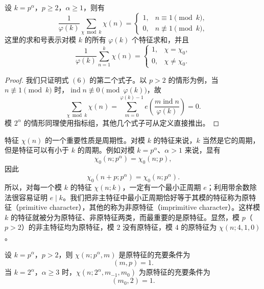 \begin{theorem}[原文 定理 3，正交性]
	设 $k=p^\alpha$，$p\geq 2$，$\alpha\geq 1$，则有
	\begin{equation}
		\frac{1}{\varphi(k)}\sum_{\chi\bmod k}\chi(n)
		=
		\begin{cases}
			1, & n\equiv 1\pmod k,\\
			0, & n\not\equiv 1\pmod k,
		\end{cases}
		\tag{6}
	\end{equation}
	这里的求和号表示对模 $k$ 的所有 $\varphi(k)$ 个特征求和，并且
	\begin{equation}
		\frac{1}{\varphi(k)}\sum_{n=1}^{k}\chi(n)
		=
		\begin{cases}
			1, & \chi=\chi_0,\\
			0, & \chi\neq\chi_0.
		\end{cases}
		\tag{6'}
	\end{equation}
\end{theorem}

\begin{proof}
	我们只证明式 \((6)\) 的第二个式子。以 $p>2$ 的情形为例，当 $n\not\equiv1\pmod k$ 时，$\operatorname{ind}n\not\equiv0\pmod{\varphi(k)}$，故
	\[
		\sum_{\chi\bmod k}\chi(n)
		=
		\sum_{m=0}^{\varphi(k)-1}
		e\left(\frac{m\operatorname{ind}n}{\varphi(k)}\right)
		=0.
	\]
	模 $2^\alpha$ 的情形同理使用指标组，其他几个式子可从定义直接推出。
\end{proof}

特征 $\chi(n)$ 的一个重要性质是周期性。对模 $k$ 的特征来说，$k$ 当然是它的周期，但是特征可以有小于 $k$ 的周期。例如对模 $k=p^\alpha$、$\alpha>1$ 来说，显有
\[
	\chi_0(n;p^\alpha)=\chi_0(n;p),
\]
因此
\[
	\chi_0(n+p;p^\alpha)=\chi_0(n;p^\alpha).
\]
所以，对每一个模 $k$ 的特征 $\chi(n;k)$，一定有一个最小正周期 $e$；利用带余数除法很容易证明 $e\mid k$。我们把非主特征中最小正周期恰好等于其模的特征称为原特征（primitive character），其他的称为非原特征（imprimitive character）。这样模 $k$ 的特征就被分为原特征、非原特征两类，而最重要的是原特征。显然，模 $p$（$p>2$）的非主特征均为原特征，模 $2$ 没有原特征，模 $4$ 的原特征为 $\chi(n;4,1,0)$。

\begin{theorem}[原文 定理 4]
	设 $k=p^\alpha$，$p>2$，则 $\chi(n;p^\alpha,m)$ 是原特征的充要条件为
	\[
		(m,p)=1.
	\]
	当 $k=2^\alpha$，$\alpha\geq 3$ 时，$\chi(n;2^\alpha,m_{-1},m_0)$ 为原特征的充要条件为
	\[
		(m_0,2)=1.
	\]
\end{theorem}

